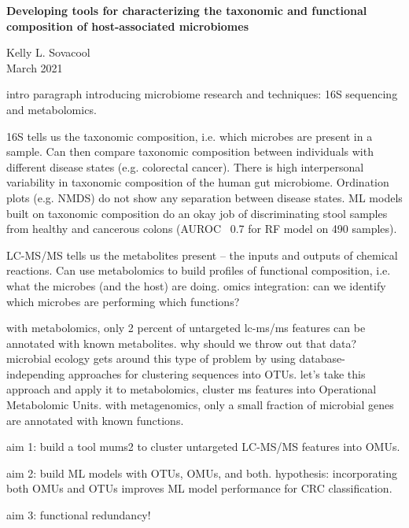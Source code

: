 \documentclass[11pt]{article}
\begin{document}
\sloppy
\begin{center}
\large{\textbf{
    Developing tools for characterizing the taxonomic and functional composition of host-associated microbiomes
}}

\vspace{11pt}

\small{
    Kelly L. Sovacool \\
    March 2021
}
\end{center}

intro paragraph introducing microbiome research and techniques: 16S sequencing and metabolomics.

16S tells us the taxonomic composition, i.e. which microbes are present in a sample.
Can then compare taxonomic composition between individuals with different disease states (e.g. colorectal cancer).
There is high interpersonal variability in taxonomic composition of the human gut microbiome. Ordination plots (e.g. NMDS) do not show any separation between disease states.
ML models built on taxonomic composition do an okay job of discriminating stool samples from healthy and cancerous colons (AUROC ~0.7 for RF model on 490 samples).

LC-MS/MS tells us the metabolites present -- the inputs and outputs of chemical reactions.
Can use metabolomics to build profiles of functional composition, i.e. what the microbes (and the host) are doing.
omics integration: can we identify which microbes are performing which functions?

with metabolomics, only 2 percent of untargeted lc-ms/ms features can be annotated with known metabolites.
why should we throw out that data?
microbial ecology gets around this type of problem by using database-independing approaches for clustering sequences into OTUs.
let's take this approach and apply it to metabolomics, cluster ms features into Operational Metabolomic Units.
with metagenomics, only a small fraction of microbial genes are annotated with known functions.

aim 1: build a tool mums2 to cluster untargeted LC-MS/MS features into OMUs.

aim 2: build ML models with OTUs, OMUs, and both. hypothesis: incorporating both OMUs and OTUs improves ML model performance for CRC classification.

aim 3:  functional redundancy!
\end{document}
